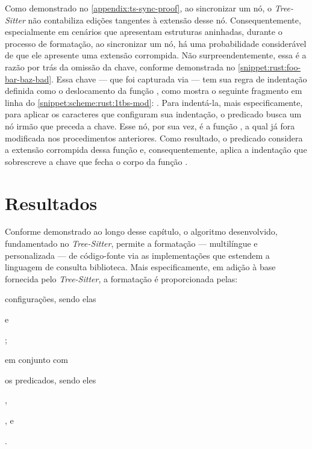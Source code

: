 \documentclass
  [11pt,a4paper,english,brazil,openright,sumario=tradicional,twoside]
  {abntex2}
\newcommand{\treesitter}{\textit{Tree-Sitter}\xspace}
\begin{document}
  Como demonstrado no \cref{appendix:ts-sync-proof}, ao sincronizar um nó, o
  \treesitter não contabiliza edições tangentes à extensão desse nó.
  Consequentemente, especialmente em cenários que apresentam estruturas
  aninhadas, durante o processo de formatação, ao sincronizar um nó, há uma
  probabilidade considerável de que ele apresente uma extensão corrompida. Não
  surpreendentemente, essa é a razão por trás da omissão da chave, conforme
  demonstrada no \cref{snippet:rust:foo-bar-baz-bad}. Essa chave --- que foi
  capturada via  --- tem sua regra de indentação
  definida como o deslocamento da função , como mostra o
  seguinte fragmento em linha do \cref{snippet:scheme:rust:1tbs-mod}:
  . Para indentá-la,
  mais especificamente, para aplicar os caracteres que configuram sua
  indentação, o predicado  busca um nó irmão que
  preceda a chave. Esse nó, por sua vez, é a função , a
  qual já fora modificada nos procedimentos anteriores. Como resultado, o
  predicado considera a extensão corrompida dessa função e, consequentemente,
  aplica a indentação que sobrescreve a chave que fecha o corpo da função
  .


  \section{Resultados}

  Conforme demonstrado ao longo desse capítulo, o algoritmo desenvolvido,
  fundamentado no \treesitter, permite a formatação --- multilíngue e
  personalizada --- de código-fonte via as implementações que estendem a
  linguagem de consulta biblioteca. Mais especificamente, em adição à base
  fornecida pelo \treesitter, a formatação é proporcionada pelas:
  \begin{inparaenum}
    \item configurações, sendo elas
          \begin{inparaenum}
            \item {} e
            \item {};
          \end{inparaenum}
          em conjunto com
    \item os predicados, sendo eles
          \begin{inparaenum}
            \item {},
            \item {}, e
            \item {}.
          \end{inparaenum}
  \end{inparaenum}
\end{document}
